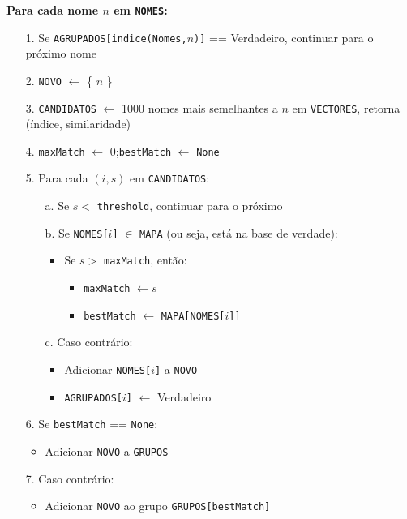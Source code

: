 \documentclass[a4paper,12pt]{article}
\begin{document}
\vspace{0.5em}
\noindent\textbf{Para cada nome $n$ em \texttt{NOMES}:}
\begin{enumerate}
    \item[1.] Se \texttt{AGRUPADOS[indice(Nomes,$n$)]} == Verdadeiro, continuar para o próximo nome
    \item[2.] \texttt{NOVO} $\leftarrow$ \{ $n$ \}
    \item[3.] \texttt{CANDIDATOS} $\leftarrow$ 1000 nomes mais semelhantes a $n$ em \texttt{VECTORES}, retorna (índice, similaridade)
    \item[4.] \texttt{maxMatch} $\leftarrow$ 0;\quad \texttt{bestMatch} $\leftarrow$ \texttt{None}
    \item[5.] Para cada $(i, s)$ em \texttt{CANDIDATOS}:
    \begin{enumerate}
        \item[a.] Se $s <$ \texttt{threshold}, continuar para o próximo
        \item[b.] Se \texttt{NOMES[$i$]} $\in$ \texttt{MAPA} (ou seja, está na base de verdade):
        \begin{itemize}
            \item Se $s >$ \texttt{maxMatch}, então:
            \begin{itemize}
                \item \texttt{maxMatch} $\leftarrow s$
                \item \texttt{bestMatch} $\leftarrow$ \texttt{MAPA[NOMES[$i$]]}
            \end{itemize}
        \end{itemize}
        \item[c.] Caso contrário:
        \begin{itemize}
            \item Adicionar \texttt{NOMES[$i$]} a \texttt{NOVO}
            \item \texttt{AGRUPADOS[$i$]} $\leftarrow$ Verdadeiro
        \end{itemize}
    \end{enumerate}
    \item[6.] Se \texttt{bestMatch} == \texttt{None}:
    \begin{itemize}
        \item Adicionar \texttt{NOVO} a \texttt{GRUPOS}
    \end{itemize}
    \item[7.] Caso contrário:
    \begin{itemize}
        \item Adicionar \texttt{NOVO} ao grupo \texttt{GRUPOS[bestMatch]}
    \end{itemize}
\end{enumerate}
\end{document}

